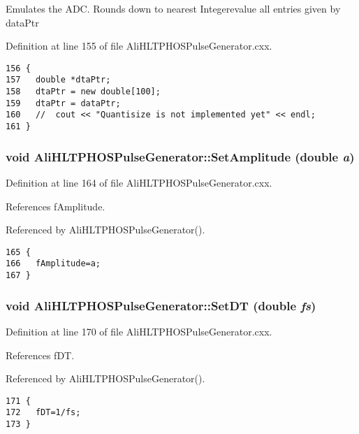 Emulates the ADC. Rounds down to nearest Integerevalue all entries given by data\-Ptr 

Definition at line 155 of file Ali\-HLTPHOSPulse\-Generator.cxx.

\footnotesize\begin{verbatim}156 {
157   double *dtaPtr;
158   dtaPtr = new double[100];
159   dtaPtr = dataPtr;
160   //  cout << "Quantisize is not implemented yet" << endl;
161 }
\end{verbatim}\normalsize 


\subsubsection{\setlength{\rightskip}{0pt plus 5cm}void Ali\-HLTPHOSPulse\-Generator::Set\-Amplitude (double {\em a})}\label{classAliHLTPHOSPulseGenerator_AliHLTPHOSPulseGeneratora12}




Definition at line 164 of file Ali\-HLTPHOSPulse\-Generator.cxx.

References f\-Amplitude.

Referenced by Ali\-HLTPHOSPulse\-Generator().

\footnotesize\begin{verbatim}165 {
166   fAmplitude=a;
167 }
\end{verbatim}\normalsize 


\subsubsection{\setlength{\rightskip}{0pt plus 5cm}void Ali\-HLTPHOSPulse\-Generator::Set\-DT (double {\em fs})}\label{classAliHLTPHOSPulseGenerator_AliHLTPHOSPulseGeneratora13}




Definition at line 170 of file Ali\-HLTPHOSPulse\-Generator.cxx.

References f\-DT.

Referenced by Ali\-HLTPHOSPulse\-Generator().

\footnotesize\begin{verbatim}171 {
172   fDT=1/fs;  
173 }
\end{verbatim}\normalsize 


